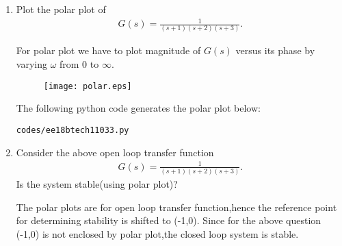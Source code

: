 \begin{enumerate}[label=\thesection.\arabic*.,ref=\thesection.\theenumi]
\item Plot the polar plot of 
\begin{align}
G(s) = \frac{1}{(s+1)(s+2)(s+3)}. 
\end{align}

\solution
For polar plot we have to plot magnitude of $G(s)$ versus its phase
by varying $\omega$ from 0 to $\infty$.


\begin{figure}[!h]
  \texttt{[image: polar.eps]}
  \label{fig:polarplot}
\end{figure}

The following python code generates the polar plot below: 
\begin{lstlisting}
codes/ee18btech11033.py
\end{lstlisting}
\item Consider the above open loop transfer function
\begin{align}
G(s) = \frac{1}{(s+1)(s+2)(s+3)}.
\end{align}
Is the system stable(using polar plot)?

\solution
The polar plots are for open loop transfer function,hence the reference point for determining stability is shifted to (-1,0).
Since for the above question (-1,0) is not enclosed by polar plot,the closed loop system is stable.
\end{enumerate}
